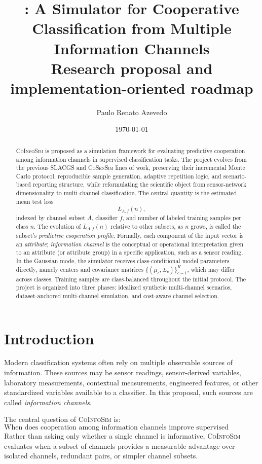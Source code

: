\documentclass[11pt,a4paper]{article}
\title{\vspace{-1.2cm}\textbf{\CoInfoSim: A Simulator for Cooperative Classification from Multiple Information Channels}\\[0.35em]
\large Research proposal and implementation-oriented roadmap}
\author{Paulo Renato Azevedo}
\date{\today}
\newcommand{\CoInfoSim}{\textsc{CoInfoSim}}
\newcommand{\CoSenSim}{\textsc{CoSenSim}}
\newcommand{\SLACGS}{\textsc{SLACGS}}
\begin{document}
\maketitle

\begin{abstract}
\noindent
\CoInfoSim{} is proposed as a simulation framework for evaluating predictive cooperation among information channels in supervised classification tasks. The project evolves from the previous \SLACGS{} and \CoSenSim{} lines of work, preserving their incremental Monte Carlo protocol, reproducible sample generation, adaptive repetition logic, and scenario-based reporting structure, while reformulating the scientific object from sensor-network dimensionality to multi-channel classification. The central quantity is the estimated mean test loss
\[
    \overline{L}_{A,f}(n),
\]
indexed by channel subset $A$, classifier $f$, and number of labeled training samples per class $n$. The evolution of $\overline{L}_{A,f}(n)$ relative to other subsets, as $n$ grows, is called the subset's \emph{predictive cooperation profile}. Formally, each component of the input vector is an \emph{attribute}; \emph{information channel} is the conceptual or operational interpretation given to an attribute (or attribute group) in a specific application, such as a sensor reading. In the Gaussian mode, the simulator receives class-conditional model parameters directly, namely centers and covariance matrices $\{(\mu_c,\Sigma_c)\}_{c=1}^{K}$, which may differ across classes. Training samples are class-balanced throughout the initial protocol. The project is organized into three phases: idealized synthetic multi-channel scenarios, dataset-anchored multi-channel simulation, and cost-aware channel selection.
\end{abstract}

\tableofcontents
\newpage

\section{Introduction}

Modern classification systems often rely on multiple observable sources of information. These sources may be sensor readings, sensor-derived variables, laboratory measurements, contextual measurements, engineered features, or other standardized variables available to a classifier. In this proposal, such sources are called \emph{information channels}.

The central question of \CoInfoSim{} is:
\[
    \text{When does cooperation among information channels improve supervised classification?}
\]
Rather than asking only whether a single channel is informative, \CoInfoSim{} evaluates when a subset of channels provides a measurable advantage over isolated channels, redundant pairs, or simpler channel subsets.
\end{document}
